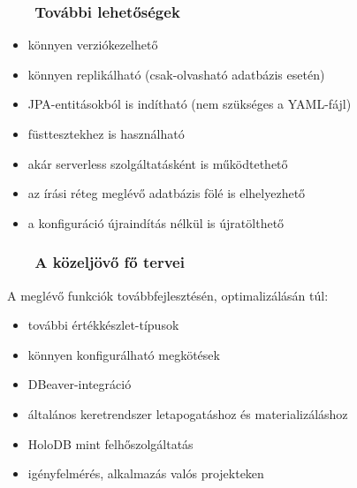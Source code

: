 \documentclass[
    aspectratio=169,
]{beamer}
\newcommand{\slidetitle}[2]{\frametitle{{\small #1 ~ \ding{226} ~ } \normalsize \textbf{#2} }}
\begin{document}
\begin{frame}
    \slidetitle{\sectionshorttitle}{További lehetőségek}
    
    \begin{itemize}
        \setlength\itemsep{1em}
        \item könnyen verziókezelhető
        \item könnyen replikálható (csak-olvasható adatbázis esetén)
        \item JPA-entitásokból is indítható (nem szükséges a YAML-fájl)
        \item füsttesztekhez is használható
        \item akár serverless szolgáltatásként is működtethető
        \item az írási réteg meglévő adatbázis fölé is elhelyezhető
        \item a konfiguráció újraindítás nélkül is újratölthető
    \end{itemize}
\end{frame}

\begin{frame}
    \slidetitle{\sectionshorttitle}{A közeljövő fő tervei}

    A meglévő funkciók továbbfejlesztésén, optimalizálásán túl:
    
    \vspace{1em}
    
    \begin{itemize}
        \setlength\itemsep{1em}
        \item további értékkészlet-típusok
        \item könnyen konfigurálható megkötések
        \item DBeaver-integráció
        \item általános keretrendszer letapogatáshoz és materializáláshoz
        \item HoloDB mint felhőszolgáltatás
        \item igényfelmérés, alkalmazás valós projekteken
    \end{itemize}
\end{frame}
        
\end{document}
